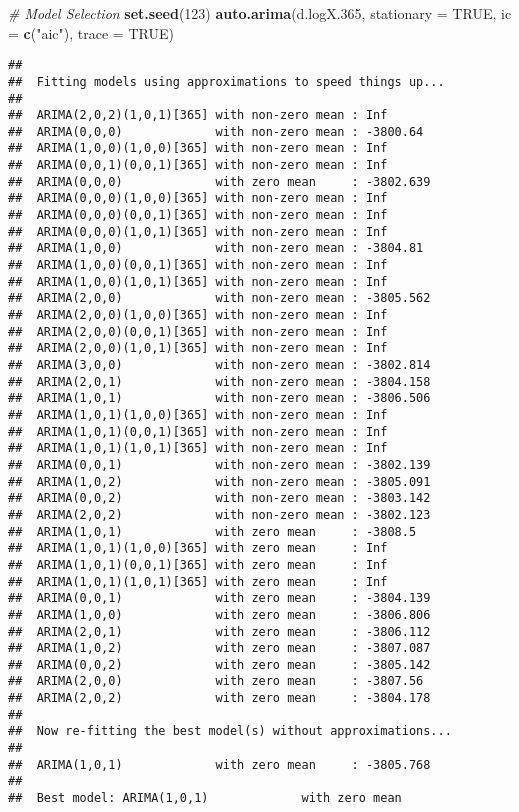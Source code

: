 \documentclass[
]{article}
\newenvironment{Shaded}{\begin{snugshade}}{\end{snugshade}}
\newcommand{\AttributeTok}[1]{\textcolor[rgb]{0.13,0.29,0.53}{#1}}
\newcommand{\CommentTok}[1]{\textcolor[rgb]{0.56,0.35,0.01}{\textit{#1}}}
\newcommand{\ConstantTok}[1]{\textcolor[rgb]{0.56,0.35,0.01}{#1}}
\newcommand{\DecValTok}[1]{\textcolor[rgb]{0.00,0.00,0.81}{#1}}
\newcommand{\FloatTok}[1]{\textcolor[rgb]{0.00,0.00,0.81}{#1}}
\newcommand{\FunctionTok}[1]{\textcolor[rgb]{0.13,0.29,0.53}{\textbf{#1}}}
\newcommand{\NormalTok}[1]{#1}
\newcommand{\StringTok}[1]{\textcolor[rgb]{0.31,0.60,0.02}{#1}}
\begin{document}
\begin{Shaded}
\begin{Highlighting}[]
\CommentTok{\# Model Selection}
\FunctionTok{set.seed}\NormalTok{(}\DecValTok{123}\NormalTok{)}
\FunctionTok{auto.arima}\NormalTok{(d.logX}\FloatTok{.365}\NormalTok{, }\AttributeTok{stationary =} \ConstantTok{TRUE}\NormalTok{, }\AttributeTok{ic =} \FunctionTok{c}\NormalTok{(}\StringTok{"aic"}\NormalTok{), }\AttributeTok{trace =} \ConstantTok{TRUE}\NormalTok{)}
\end{Highlighting}
\end{Shaded}

\begin{verbatim}
## 
##  Fitting models using approximations to speed things up...
## 
##  ARIMA(2,0,2)(1,0,1)[365] with non-zero mean : Inf
##  ARIMA(0,0,0)             with non-zero mean : -3800.64
##  ARIMA(1,0,0)(1,0,0)[365] with non-zero mean : Inf
##  ARIMA(0,0,1)(0,0,1)[365] with non-zero mean : Inf
##  ARIMA(0,0,0)             with zero mean     : -3802.639
##  ARIMA(0,0,0)(1,0,0)[365] with non-zero mean : Inf
##  ARIMA(0,0,0)(0,0,1)[365] with non-zero mean : Inf
##  ARIMA(0,0,0)(1,0,1)[365] with non-zero mean : Inf
##  ARIMA(1,0,0)             with non-zero mean : -3804.81
##  ARIMA(1,0,0)(0,0,1)[365] with non-zero mean : Inf
##  ARIMA(1,0,0)(1,0,1)[365] with non-zero mean : Inf
##  ARIMA(2,0,0)             with non-zero mean : -3805.562
##  ARIMA(2,0,0)(1,0,0)[365] with non-zero mean : Inf
##  ARIMA(2,0,0)(0,0,1)[365] with non-zero mean : Inf
##  ARIMA(2,0,0)(1,0,1)[365] with non-zero mean : Inf
##  ARIMA(3,0,0)             with non-zero mean : -3802.814
##  ARIMA(2,0,1)             with non-zero mean : -3804.158
##  ARIMA(1,0,1)             with non-zero mean : -3806.506
##  ARIMA(1,0,1)(1,0,0)[365] with non-zero mean : Inf
##  ARIMA(1,0,1)(0,0,1)[365] with non-zero mean : Inf
##  ARIMA(1,0,1)(1,0,1)[365] with non-zero mean : Inf
##  ARIMA(0,0,1)             with non-zero mean : -3802.139
##  ARIMA(1,0,2)             with non-zero mean : -3805.091
##  ARIMA(0,0,2)             with non-zero mean : -3803.142
##  ARIMA(2,0,2)             with non-zero mean : -3802.123
##  ARIMA(1,0,1)             with zero mean     : -3808.5
##  ARIMA(1,0,1)(1,0,0)[365] with zero mean     : Inf
##  ARIMA(1,0,1)(0,0,1)[365] with zero mean     : Inf
##  ARIMA(1,0,1)(1,0,1)[365] with zero mean     : Inf
##  ARIMA(0,0,1)             with zero mean     : -3804.139
##  ARIMA(1,0,0)             with zero mean     : -3806.806
##  ARIMA(2,0,1)             with zero mean     : -3806.112
##  ARIMA(1,0,2)             with zero mean     : -3807.087
##  ARIMA(0,0,2)             with zero mean     : -3805.142
##  ARIMA(2,0,0)             with zero mean     : -3807.56
##  ARIMA(2,0,2)             with zero mean     : -3804.178
## 
##  Now re-fitting the best model(s) without approximations...
## 
##  ARIMA(1,0,1)             with zero mean     : -3805.768
## 
##  Best model: ARIMA(1,0,1)             with zero mean
\end{verbatim}
\end{document}

